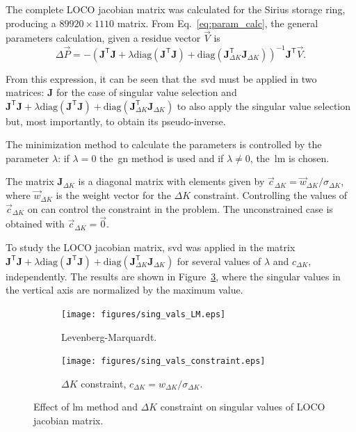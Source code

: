 The complete LOCO jacobian matrix was calculated for the Sirius storage ring, producing a $89920 \times 1110$ matrix. From Eq.~\eqref{eq:param_calc}, the general parameters calculation, given a residue vector $\vec{V}$ is
\begin{equation*}
\Delta \vec{P} = - \left(\mathbf{J}^{\mathsf{T}}\mathbf{J} + \lambda \mathrm{diag}\left(\mathbf{J}^{\mathsf{T}}\mathbf{J}\right) + \mathrm{diag}\left(\mathbf{J}^{\mathsf{T}}_{\Delta K}\mathbf{J}_{\Delta K}\right) \right)^{-1}\mathbf{J}^{\mathsf{T}}\vec{V}.
\end{equation*}

From this expression, it can be seen that the~\gls{svd} must be applied in two matrices: $\mathbf{J}$ for the case of singular value selection and $\mathbf{J}^{\mathsf{T}}\mathbf{J} + \lambda \mathrm{diag}\left(\mathbf{J}^{\mathsf{T}}\mathbf{J}\right) + \mathrm{diag}\left(\mathbf{J}^{\mathsf{T}}_{\Delta K}\mathbf{J}_{\Delta K}\right)$ to also apply the singular value selection but, most importantly, to obtain its pseudo-inverse.

The minimization method to calculate the parameters is controlled by the parameter $\lambda$: if $\lambda = 0$ the~\gls{gn} method is used and if $\lambda \neq 0$, the~\gls{lm} is chosen.

The matrix $\mathbf{J}_{\Delta K}$ is a diagonal matrix with elements given by $\vec{c}_{\Delta K} = \vec{w}_{\Delta K}/\sigma_{\Delta K}$, where $\vec{w}_{\Delta K}$ is the weight vector for the ${\Delta K}$ constraint. Controlling the values of $\vec{c}_{\Delta K}$ on can control the constraint in the problem. The unconstrained case is obtained with $\vec{c}_{\Delta K} = \vec{0}$.

To study the LOCO jacobian matrix, \gls{svd} was applied in the matrix $\mathbf{J}^{\mathsf{T}}\mathbf{J} + \lambda \mathrm{diag}\left(\mathbf{J}^{\mathsf{T}}\mathbf{J}\right) + \mathrm{diag}\left(\mathbf{J}^{\mathsf{T}}_{\Delta K}\mathbf{J}_{\Delta K}\right)$ for several values of $\lambda$ and ${c}_{\Delta K}$, independently. The results are shown in Figure~\ref{fig:singval}, where the singular values in the vertical axis are normalized by the maximum value.
\begin{figure}
\centering
\begin{subfigure}[t]{0.49\textwidth}
\texttt{[image: figures/sing\_vals\_LM.eps]}
    \caption{Levenberg-Marquardt.}
    \label{subfig:lm}
\end{subfigure}
 \begin{subfigure}[t]{0.49\textwidth}
\texttt{[image: figures/sing\_vals\_constraint.eps]}
    \caption{$\Delta K$ constraint, $c_{\Delta K} = w_{\Delta K}/\sigma_{\Delta K}$.}
    \label{subfig:constraint}
\end{subfigure}
\caption{Effect of \gls{lm} method and $\Delta K$ constraint on singular values of LOCO jacobian matrix.}
\label{fig:singval}
\end{figure}

